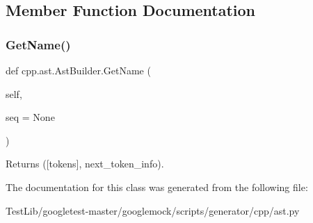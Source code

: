 \subsection{Member Function Documentation}
\mbox{\label{classcpp_1_1ast_1_1AstBuilder_a327957c4228325fc5f64821b047bdc6f}} 
\subsubsection{\texorpdfstring{Get\+Name()}{GetName()}}
{\footnotesize\ttfamily def cpp.\+ast.\+Ast\+Builder.\+Get\+Name (\begin{DoxyParamCaption}\item[{}]{self,  }\item[{}]{seq = {\ttfamily None} }\end{DoxyParamCaption})}

\begin{DoxyVerb}Returns ([tokens], next_token_info).\end{DoxyVerb}
 

The documentation for this class was generated from the following file\+:\begin{DoxyCompactItemize}
\item 
Test\+Lib/googletest-\/master/googlemock/scripts/generator/cpp/ast.\+py\end{DoxyCompactItemize}
